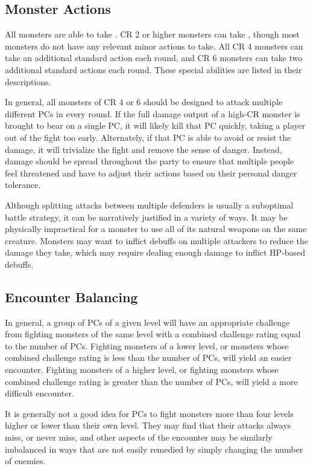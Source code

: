     \subsection{Monster Actions}
        All monsters are able to take .
        CR 2 or higher monsters can take , though most monsters do not have any relevant minor actions to take.
        All CR 4 monsters can take an additional standard action each round, and CR 6 monsters can take two additional standard actions each round.
        These special abilities are listed in their descriptions.

        In general, all monsters of CR 4 or 6 should be designed to attack multiple different PCs in every round.
        If the full damage output of a high-CR monster is brought to bear on a single PC, it will likely kill that PC quickly, taking a player out of the fight too early.
        Alternately, if that PC is able to avoid or resist the damage, it will trivialize the fight and remove the sense of danger.
        Instead, damage should be spread throughout the party to ensure that multiple people feel threatened and have to adjust their actions based on their personal danger tolerance.

        Although splitting attacks between multiple defenders is usually a suboptimal battle strategy, it can be narratively justified in a variety of ways.
        It may be physically impractical for a monster to use all of its natural weapons on the same creature.
        Monsters may want to inflict debuffs on multiple attackers to reduce the damage they take, which may require dealing enough damage to inflict HP-based debuffs.

    \subsection{Encounter Balancing}\label{Encounter Balancing}
        In general, a group of PCs of a given level will have an appropriate challenge from fighting monsters of the same level with a combined challenge rating equal to the number of PCs.
        Fighting monsters of a lower level, or monsters whose combined challenge rating is less than the number of PCs, will yield an easier encounter.
        Fighting monsters of a higher level, or fighting monsters whose combined challenge rating is greater than the number of PCs, will yield a more difficult encounter.

        It is generally not a good idea for PCs to fight monsters more than four levels higher or lower than their own level.
        They may find that their attacks always miss, or never miss, and other aspects of the encounter may be similarly imbalanced in ways that are not easily remedied by simply changing the number of enemies.

